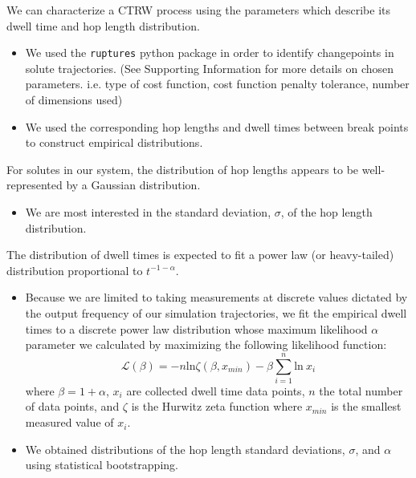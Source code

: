 \documentclass{article}
\begin{document}
  \noindent We can characterize a CTRW process using the parameters which describe its
  dwell time and hop length distribution.
  \begin{itemize}
	\item We used the \texttt{ruptures} python package in order to identify
	changepoints in solute trajectories.\cite{truong_ruptures:_2018} (See Supporting
	Information for more details on chosen parameters. i.e. type of cost function, 
	cost function penalty tolerance, number of dimensions used)
	\item We used the corresponding hop lengths and dwell times between break points
	to construct empirical distributions.
  \end{itemize}
	
  For solutes in our system, the distribution of hop lengths appears to be
  well-represented by a Gaussian distribution.~\cite{metzler_random_2000,
  metzler_anomalous_2014,neusius_subdiffusion_2009}
  \begin{itemize}
	\item We are most interested in the standard deviation, $\sigma$, of the 
	hop length distribution.
  \end{itemize}
  
  The distribution of dwell	times is expected to fit a power law (or heavy-tailed)
  distribution proportional to $t^{-1-\alpha}$.~\cite{meroz_toolbox_2015}
  \begin{itemize}
	\item Because we are limited to taking measurements at discrete values
	dictated by the output frequency of our simulation trajectories, we fit the
	empirical dwell times to a discrete power law distribution whose maximum
	likelihood $\alpha$ parameter we calculated by maximizing the following
	likelihood function: 
        \begin{equation}
	\mathcal{L}(\beta) = -n\text{ln}\zeta(\beta, x_{min}) -
	\beta\sum_{i=1}^{n} \text{ln}~x_i 
	\label{eqn:powerlaw_likelihood}
	\end{equation}
	where $\beta = 1 + \alpha$, $x_i$ are collected dwell time data points,
	$n$ the total number of data points, and $\zeta$ is the Hurwitz zeta function
	where $x_{min}$ is the smallest measured value of
	$x_i$.~\cite{clauset_power-law_2009} 
	\item We obtained distributions of the hop length standard deviations, $\sigma$, and
	$\alpha$ using statistical bootstrapping.\cite{efron_introduction_1994} 
  \end{itemize}
  
\end{document}
